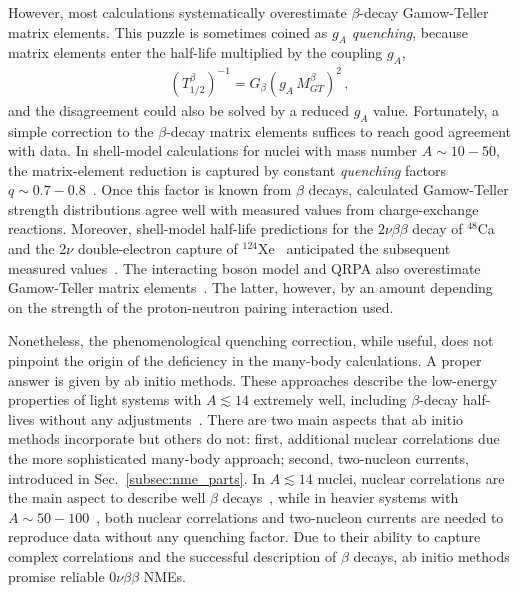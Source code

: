 However, most calculations systematically overestimate $\beta$-decay Gamow-Teller matrix elements. This puzzle is sometimes coined as {\it $g_A$ quenching}, because matrix elements enter the half-life multiplied by the coupling $g_A$,
\begin{align}
\left(T_{1/2}^\beta\right)^{-1} =  G_{\beta}\left(g_A\,M^{\beta}_{GT}\right)^2\,,
\label{eq:beta}
\end{align}
and the disagreement could also be solved by a reduced $g_A$ value. Fortunately, a simple correction to the $\beta$-decay matrix elements suffices to reach good agreement with data. In shell-model calculations for nuclei with mass number $A\sim10-50$, the matrix-element reduction is captured by constant {\it quenching} factors $q\sim 0.7-0.8$~\cite{Chou:1993zz,Wildenthal:1983zz,Martinez-Pinedo:1996zvt}. Once this factor is known from $\beta$ decays, calculated Gamow-Teller strength distributions agree well with measured values from charge-exchange reactions. Moreover, shell-model half-life predictions for the $2\nu\beta\beta$ decay of $^{48}$Ca~\cite{Caurier:1990dc,Poves:1995rg} and the $2\nu$ double-electron capture of $^{124}$Xe~\cite{CoelloPerez:2018ghg} anticipated the subsequent measured values~\cite{Balysh:1996vr,XENON:2019dti}. The interacting boson model and QRPA also overestimate Gamow-Teller matrix elements~\cite{Barea:2015kwa,Pirinen:2015sma}. The latter, however, by an amount depending on the strength of the proton-neutron pairing interaction used.

Nonetheless, the phenomenological quenching correction, while useful, does not pinpoint the origin of the deficiency in the many-body calculations. A proper answer is given by ab initio methods. These approaches describe the low-energy properties of light systems with $A\lesssim 14$ extremely well, including $\beta$-decay half-lives without any adjustments~\cite{Pastore:2017uwc,Gysbers:2019uyb}. There are two main aspects that ab initio methods incorporate but others do not: first, additional nuclear correlations due the more sophisticated many-body approach; second, two-nucleon currents, introduced in Sec.~\ref{subsec:nme_parts}. In $A\lesssim 14$ nuclei, nuclear correlations are the main aspect to describe well $\beta$ decays~\cite{Pastore:2017uwc,King:2020wmp}, while in heavier systems with $A\sim50-100$~\cite{Gysbers:2019uyb}, both nuclear correlations and two-nucleon currents are needed to reproduce data without any quenching factor. Due to their ability to capture complex correlations and the successful description of $\beta$ decays, ab initio methods promise reliable $0\nu\beta\beta$ NMEs.

